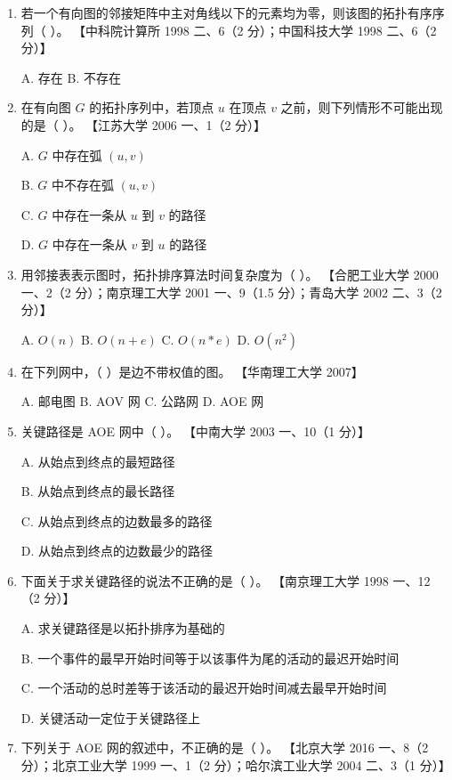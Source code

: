 \documentclass[lang=cn,newtx,10pt,scheme=chinese]{../../elegantbook}
\begin{document}
\begin{enumerate}
    \item 若一个有向图的邻接矩阵中主对角线以下的元素均为零，则该图的拓扑有序序列（ ）。  
    【中科院计算所 1998 二、6（2 分）；中国科技大学 1998 二、6（2 分）】  

    A. 存在 \quad B. 不存在  

    \item 在有向图 $G$ 的拓扑序列中，若顶点 $u$ 在顶点 $v$ 之前，则下列情形不可能出现的是（ ）。  
    【江苏大学 2006 一、1（2 分）】  

    A. $G$ 中存在弧 $(u, v)$  

    B. $G$ 中不存在弧 $(u, v)$  

    C. $G$ 中存在一条从 $u$ 到 $v$ 的路径  

    D. $G$ 中存在一条从 $v$ 到 $u$ 的路径  

    \item 用邻接表表示图时，拓扑排序算法时间复杂度为（ ）。  
    【合肥工业大学 2000 一、2（2 分）；南京理工大学 2001 一、9（1.5 分）；青岛大学 2002 二、3（2 分）】 

    A. $O(n)$ \quad B. $O(n+e)$ \quad C. $O(n*e)$ \quad D. $O(n^2)$  

    \item 在下列网中，（ ）是边不带权值的图。  
    【华南理工大学 2007】  

    A. 邮电图 \quad B. AOV 网 \quad C. 公路网 \quad D. AOE 网  

    \item 关键路径是 AOE 网中（ ）。  
    【中南大学 2003 一、10（1 分）】  

    A. 从始点到终点的最短路径  

    B. 从始点到终点的最长路径  

    C. 从始点到终点的边数最多的路径  

    D. 从始点到终点的边数最少的路径  

    \item 下面关于求关键路径的说法不正确的是（ ）。  
    【南京理工大学 1998 一、12（2 分）】  

    A. 求关键路径是以拓扑排序为基础的  

    B. 一个事件的最早开始时间等于以该事件为尾的活动的最迟开始时间  

    C. 一个活动的总时差等于该活动的最迟开始时间减去最早开始时间  

    D. 关键活动一定位于关键路径上  

    \item 下列关于 AOE 网的叙述中，不正确的是（ ）。  
    【北京大学 2016 一、8（2 分）；北京工业大学 1999 一、1（2 分）；哈尔滨工业大学 2004 二、3（1 分）】  


\end{enumerate}
\end{document}
